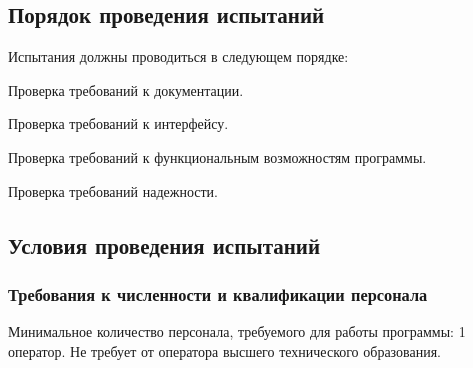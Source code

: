 \subsection{Порядок проведения испытаний}
Испытания должны проводиться в следующем порядке:
\begin{my_enumerate}
\item Проверка требований к документации.
\item Проверка требований к интерфейсу.
\item Проверка требований к функциональным возможностям программы.
\item Проверка требований надежности.
\end{my_enumerate}


\subsection{Условия проведения испытаний}

\subsubsection{Требования к численности и квалификации персонала}
Минимальное количество персонала, требуемого для работы программы: 1 оператор.  Не требует от оператора высшего технического образования. 